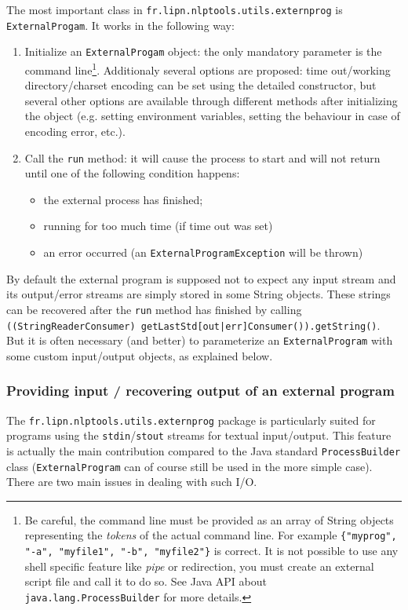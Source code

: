 \documentclass{article}
\newenvironment{xenumerate}{
\begin{enumerate}
  \setlength{\itemsep}{.3\baselineskip}
  \setlength{\topsep}{0pt}
  \setlength{\parskip}{0pt}
  \setlength{\parsep}{0pt}
}{\end{enumerate}}
\newenvironment{xitemize}{
\begin{itemize}
  \setlength{\itemsep}{.3\baselineskip}
  \setlength{\topsep}{0pt}
  \setlength{\parskip}{0pt}
  \setlength{\parsep}{0pt}
}{\end{itemize}}
\newcommand{\packname}{fr.lipn.nlptools}
\newcommand{\utilsPackname}{\packname.utils}
\begin{document}
The most important class in {\tt \utilsPackname .externprog} is {\tt ExternalProgam}. It works in the following way:
\begin{xenumerate}
\item Initialize an  {\tt ExternalProgam} object: the only mandatory parameter is the command line\footnote{Be careful, the command line must be provided as an array of String objects representing the {\em tokens} of the actual command line. For example {\tt \{"myprog", "-a", "myfile1", "-b", "myfile2"\}} is correct. It is not possible to use any shell specific feature like {\em pipe} or redirection, you must create an external script file and call it to do so. See Java API about {\tt java.lang.ProcessBuilder} for more details.}. Additionaly several options are proposed: time out/working directory/charset encoding can be set using the detailed constructor, but several other options are available through different methods after initializing the object (e.g. setting environment variables, setting the behaviour in case of encoding error, etc.).
\item Call the {\tt run} method: it will cause the process to start and will not return until one of the following condition happens:
\begin{xitemize}
\item the external process has finished;
\item running for too much time (if time out was set)
\item an error occurred (an {\tt ExternalProgramException} will be thrown)
\end{xitemize}
\end{xenumerate}

By default the external program is supposed not to expect any input stream and its output/error streams are simply stored in some String objects. These strings can be recovered after the {\tt run} method has finished by calling {\tt ((StringReaderConsumer) getLastStd[out|err]Consumer()).getString()}. But it is often necessary (and better) to parameterize an {\tt ExternalProgram} with some custom input/output objects, as explained below.


\subsubsection{Providing input / recovering output of an external program}
\label{ReaderConsumerWriterFeeder}

The {\tt \utilsPackname .externprog} package is particularly suited for programs using the {\tt stdin}/{\tt stout} streams for textual input/output. This feature is actually the main contribution compared to the Java standard {\tt ProcessBuilder} class ({\tt ExternalProgram} can of course still be used in the more simple case). There are two main issues in dealing with such I/O.
\end{document}
